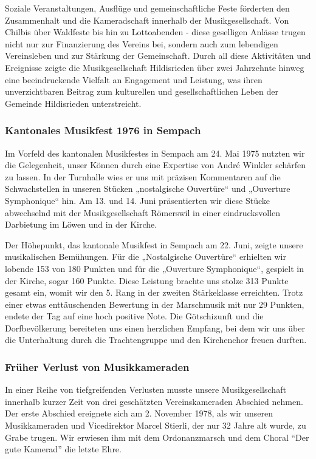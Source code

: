 \begin{history}
    Soziale Veranstaltungen, Ausflüge und gemeinschaftliche Feste förderten den
    Zusammenhalt und die Kameradschaft innerhalb der Musikgesellschaft. Von
    Chilbis über Waldfeste bis hin zu Lottoabenden - diese geselligen Anlässe
    trugen nicht nur zur Finanzierung des Vereins bei, sondern auch zum
    lebendigen Vereinsleben und zur Stärkung der Gemeinschaft. Durch all diese
    Aktivitäten und Ereignisse zeigte die Musikgesellschaft Hildisrieden über
    zwei Jahrzehnte hinweg eine beeindruckende Vielfalt an Engagement und
    Leistung, was ihren unverzichtbaren Beitrag zum kulturellen und
    gesellschaftlichen Leben der Gemeinde Hildisrieden unterstreicht.

    \clearpage

    \subsubsection*{Kantonales Musikfest 1976 in Sempach}

    Im Vorfeld des kantonalen Musikfestes in Sempach am 24. Mai 1975 nutzten wir
    die Gelegenheit, unser Können durch eine Expertise von André Winkler
    schärfen zu lassen. In der Turnhalle wies er uns mit präzisen Kommentaren
    auf die Schwachstellen in unseren Stücken „nostalgische Ouvertüre“ und
    „Ouverture Symphonique“ hin. Am 13. und 14. Juni präsentierten wir diese
    Stücke abwechselnd mit der Musikgesellschaft Römerswil in einer
    eindrucksvollen Darbietung im Löwen und in der Kirche.

    Der Höhepunkt, das kantonale Musikfest in Sempach am 22. Juni, zeigte unsere
    musikalischen Bemühungen. Für die „Nostalgische Ouvertüre“ erhielten wir
    lobende 153 von 180 Punkten und für die „Ouverture Symphonique“, gespielt in
    der Kirche, sogar 160 Punkte. Diese Leistung brachte uns stolze 313 Punkte
    gesamt ein, womit wir den 5. Rang in der zweiten Stärkeklasse erreichten.
    Trotz einer etwas enttäuschenden Bewertung in der Marschmusik mit nur 29
    Punkten, endete der Tag auf eine hoch positive Note. Die Götschizunft und
    die Dorfbevölkerung bereiteten uns einen herzlichen Empfang, bei dem wir uns
    über die Unterhaltung durch die Trachtengruppe und den Kirchenchor freuen
    durften.

    \subsubsection*{Früher Verlust von Musikkameraden}
    In einer Reihe von tiefgreifenden Verlusten musste unsere Musikgesellschaft
    innerhalb kurzer Zeit von drei geschätzten Vereinskameraden Abschied nehmen.
    Der erste Abschied ereignete sich am 2. November 1978, als wir unseren
    Musikkameraden und Vicedirektor Marcel Stierli, der nur 32 Jahre alt wurde,
    zu Grabe trugen. Wir erwiesen ihm mit dem Ordonanzmarsch und dem Choral
    \enquote{Der gute Kamerad} die letzte Ehre.


\end{history}

